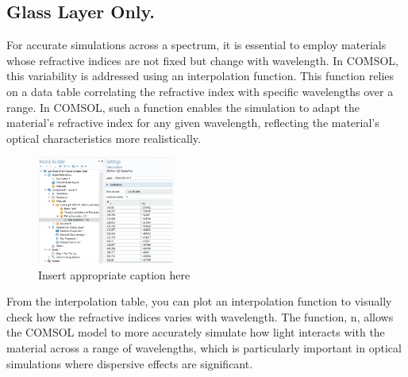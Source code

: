 \subsection{Glass Layer Only.}


For accurate simulations across a spectrum, it is essential to employ materials whose refractive indices are not fixed but change with wavelength. In COMSOL, this variability is addressed using an interpolation function. This function relies on a data table correlating the refractive index with specific wavelengths over a range. In COMSOL, such a function enables the simulation to adapt the material's refractive index for any given wavelength, reflecting the material's optical characteristics more realistically.

\begin{figure}[ht!]
  \centering
  \includegraphics[width=0.4\textwidth]{Chapters/Figures/Chapter 4 Figures/Interpolation Table for Glass Substrate.png}
  \caption{Insert appropriate caption here}
  \label{fig:Insert appropriate label here}
\end{figure}

From the interpolation table, you can plot an interpolation function to visually check how the refractive indices varies with wavelength. The function, n, allows the COMSOL model to more accurately simulate how light interacts with the material across a range of wavelengths, which is particularly important in optical simulations where dispersive effects are significant.

